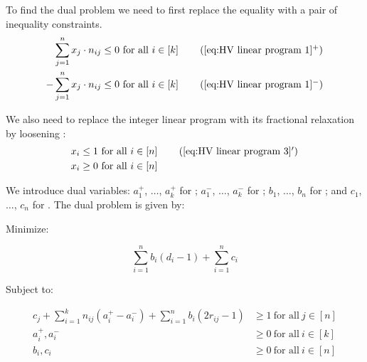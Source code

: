 To find the dual problem we need to first replace the equality  with a pair of inequality constraints.
\begin{align*}
	\sum_{j=1}^{n} x_j \cdot n_{ij}		&\leq 0\ \text{for all}\ i\in \left[k\right]\tag{\ref*{eq:HV linear program 1}$^+$}\label{eq:HV linear program 1+}\\
	-\sum_{j=1}^{n} x_j \cdot n_{ij}	&\leq 0\ \text{for all}\ i\in \left[k\right]\tag{\ref*{eq:HV linear program 1}$^-$}\label{eq:HV linear program 1-}
\end{align*}

We also need to replace the integer linear program with its fractional relaxation by loosening :
\begin{align*}
	x_i &\leq 1\ \text{for all}\ i\in \left[n\right]\tag{\ref*{eq:HV linear program 3}$^\prime$}\label{eq:HV linear program 3'}\\
	x_i &\geq 0\ \text{for all}\ i\in \left[n\right]
\end{align*}

We introduce dual variables: $a_1^{+}$, $\dotsc$, $a_k^{+}$ for ; $a_1^{-}$, $\dotsc$, $a_k^{-}$ for ; $b_1$, $\dotsc$, $b_n$ for ; and $c_1$, $\dotsc$, $c_n$ for . The dual problem is given by:

\noindent\hfill\parbox{0.75\textwidth}{Minimize:}\hfill\null
\[ \sum_{i=1}^{n} b_i\left(d_i-1\right) + \sum_{i=1}^{n}c_i\]
\hfill\parbox{0.75\textwidth}{Subject to:}\hfill\null
\begin{align*}
	c_j + \sum_{i=1}^{k}n_{ij}\left(a_i^{+}-a_i^{-}\right) + \sum_{i=1}^{n}b_i\left(2r_{ij}-1\right) &\geq 1\ \text{for all}\ j\in \left[n\right]\\
	a_i^{+}, a_i^{-}&\geq 0\ \text{for all}\ i \in \left[k\right]\\
	b_i, c_i &\geq 0\ \text{for all}\ i \in \left[n\right]
\end{align*}


